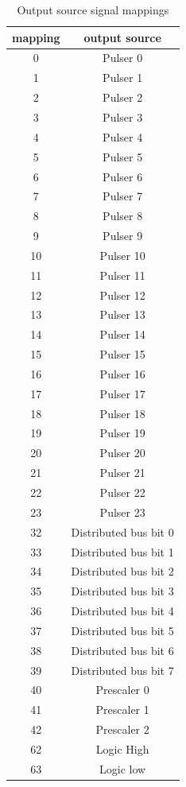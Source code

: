 \documentclass[12pt,a4paper]{article}
\begin{document}
\begin{table}[!hbt]
\caption{Output source signal mappings}
\label{tab:mappings}
\centering
	\begin{tabular}{|c|c|}
		\hline \textbf{mapping} & \textbf{output source} \\ \hline 
		\hline 0 & Pulser 0 \\ 
		\hline 1 & Pulser 1 \\ 
		\hline 2 & Pulser 2 \\ 
		\hline 3 & Pulser 3 \\ 
		\hline 4 & Pulser 4 \\ 
		\hline 5 & Pulser 5 \\ 
		\hline 6 & Pulser 6 \\ 
		\hline 7 & Pulser 7 \\ 
		\hline 8 & Pulser 8 \\ 
		\hline 9 & Pulser 9 \\ 
		\hline 10 & Pulser 10 \\ 
		\hline 11 & Pulser 11 \\ 
		\hline 12 & Pulser 12 \\ 
		\hline 13 & Pulser 13 \\ 
		\hline 14 & Pulser 14 \\ 
		\hline 15 & Pulser 15 \\ 
		\hline 16 & Pulser 16 \\ 
		\hline 17 & Pulser 17 \\ 
		\hline 18 & Pulser 18 \\ 
		\hline 19 & Pulser 19 \\ 
		\hline 20 & Pulser 20 \\ 
		\hline 21 & Pulser 21 \\
		\hline 22 & Pulser 22 \\
		\hline 23 & Pulser 23 \\
		\hline 32 & Distributed bus bit 0 \\ 
		\hline 33 & Distributed bus bit 1 \\ 
		\hline 34 & Distributed bus bit 2 \\ 
		\hline 35 & Distributed bus bit 3 \\ 
		\hline 36 & Distributed bus bit 4 \\ 
		\hline 37 & Distributed bus bit 5 \\ 
		\hline 38 & Distributed bus bit 6 \\ 
		\hline 39 & Distributed bus bit 7 \\ 
		\hline 40 & Prescaler 0 \\ 
		\hline 41 & Prescaler 1 \\ 
		\hline 42 & Prescaler 2 \\ 
		\hline 62 & Logic High \\ 
		\hline 63 & Logic low \\ 
		\hline 
	\end{tabular} 
\end{table}
\end{document}
